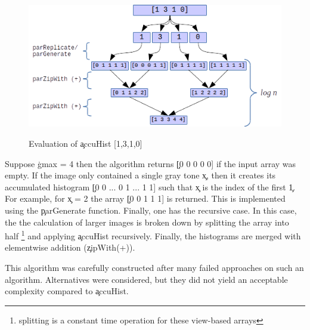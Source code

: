   \begin{figure}[h]
    \centering
    \includegraphics[width=\linewidth]{accuHist}
    \label{figure:accuHist}
    \caption{Evaluation of \c{accuHist [1,3,1,0]}}
  \end{figure}
  
  Suppose \c{gmax = 4} then the algorithm returns \c{[0 0 0 0 0]} if
  the input array was empty. If the image only contained a single gray tone
  \c{x}, then it creates its accumulated histogram
  \c{[0 0 ... 0 1 ... 1 1]} such that \c{x} is the index
  of the first \c{1}.
  For example, for \c{x = 2} the array
  \c{[0 0 1 1 1]} is returned. This is implemented using the \c{parGenerate} function.
  Finally, one has the recursive case. In this case, the the calculation
  of larger images is broken down by splitting the array into half
  \footnote{splitting is a constant time operation
  for these view-based arrays} and applying \c{accuHist}
  recursively. Finally, the histograms are merged with elementwise addition
  ({\c{zipWith(+)}}).
  
  This algorithm was carefully constructed after many failed approaches
  on such an algorithm. Alternatives were considered, but they did not
  yield an acceptable complexity compared to \c{accuHist}.

